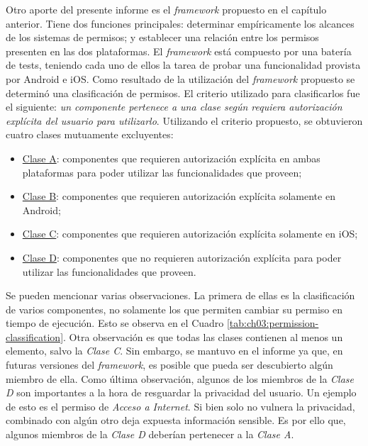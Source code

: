 Otro aporte del presente informe es el \emph{framework} propuesto en el capítulo anterior. Tiene dos funciones principales: determinar empíricamente los alcances de los sistemas de permisos; y establecer una relación entre los permisos presenten en las dos plataformas. El \emph{framework} está compuesto por una batería de tests, teniendo cada uno de ellos la tarea de probar una funcionalidad provista por Android e iOS. Como resultado de la utilización del \emph{framework} propuesto se determinó una clasificación de permisos. El criterio utilizado para clasificarlos fue el siguiente: \emph{un componente pertenece a una clase según requiera autorización explícita del usuario para utilizarlo}. Utilizando el criterio propuesto, se obtuvieron cuatro clases mutuamente excluyentes:
\begin{itemize}
    \item \underline{Clase A}: componentes que requieren autorización explícita en ambas plataformas para poder utilizar las funcionalidades que proveen;
    \item \underline{Clase B}: componentes que requieren autorización explícita solamente en Android;
    \item \underline{Clase C}: componentes que requieren autorización explícita solamente en iOS;
    \item \underline{Clase D}: componentes que no requieren autorización explícita para poder utilizar las funcionalidades que proveen.
\end{itemize}
Se pueden mencionar varias observaciones. La primera de ellas es la clasificación de varios componentes, no solamente los que permiten cambiar su permiso en tiempo de ejecución. Esto se observa en el Cuadro \ref{tab:ch03:permission-classification}. Otra observación es que todas las clases contienen al menos un elemento, salvo la \emph{Clase C}. Sin embargo, se mantuvo en el informe ya que, en futuras versiones del \emph{framework}, es posible que pueda ser descubierto algún miembro de ella. Como última observación, algunos de los miembros de la \emph{Clase D} son importantes a la hora de resguardar la privacidad del usuario. Un ejemplo de esto es el permiso de \emph{Acceso a Internet}. Si bien solo no vulnera la privacidad, combinado con algún otro deja expuesta información sensible. Es por ello que, algunos miembros de la \emph{Clase D} deberían pertenecer a la \emph{Clase A}.\\

